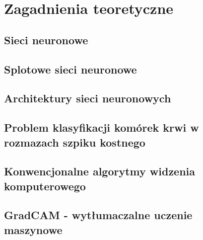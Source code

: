\chapter{Zagadnienia teoretyczne}

\section{Sieci neuronowe}

\section{Splotowe sieci neuronowe}

\section{Architektury sieci neuronowych}

\section{Problem klasyfikacji komórek krwi w rozmazach szpiku kostnego}

\section{Konwencjonalne algorytmy widzenia komputerowego}

\section{GradCAM - wytłumaczalne uczenie maszynowe}